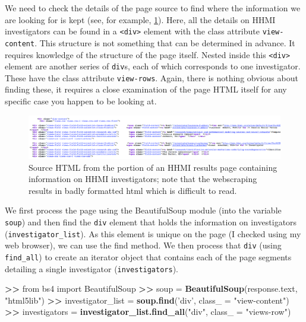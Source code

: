 \documentclass[]{krantz}
\newenvironment{Shaded}{\begin{snugshade}}{\end{snugshade}}
\newcommand{\KeywordTok}[1]{\textcolor[rgb]{0.13,0.29,0.53}{\textbf{#1}}}
\newcommand{\DataTypeTok}[1]{\textcolor[rgb]{0.13,0.29,0.53}{#1}}
\newcommand{\StringTok}[1]{\textcolor[rgb]{0.31,0.60,0.02}{#1}}
\newcommand{\OperatorTok}[1]{\textcolor[rgb]{0.81,0.36,0.00}{\textbf{#1}}}
\newcommand{\ErrorTok}[1]{\textcolor[rgb]{0.64,0.00,0.00}{\textbf{#1}}}
\newcommand{\NormalTok}[1]{#1}
\begin{document}
We need to check the details of the page source to find where the
information we are looking for is kept (see, for example,
\ref{fig:fig2-1}). Here, all the details on HHMI investigators can be
found in a \texttt{\textless{}div\textgreater{}} element with the class
attribute \texttt{view-content}. This structure is not something that
can be determined in advance. It requires knowledge of the structure of
the page itself. Nested inside this
\texttt{\textless{}div\textgreater{}} element are another series of
\texttt{div}s, each of which corresponds to one investigator. These have
the class attribute \texttt{view-rows}. Again, there is nothing obvious
about finding these, it requires a close examination of the page HTML
itself for any specific case you happen to be looking at.

\begin{figure}

{\centering \includegraphics[width=0.7\linewidth]{ChapterWeb/figures/fig2-1} 

}

\caption{Source HTML from the portion of an HHMI results page containing information on HHMI investigators; note that the webscraping results in badly formatted html which is difficult to read.}\label{fig:fig2-1}
\end{figure}

We first process the page using the BeautifulSoup module (into the
variable \texttt{soup}) and then find the \texttt{div} element that
holds the information on investigators (\texttt{investigator\_list}). As
this element is unique on the page (I checked using my web browser), we
can use the find method. We then process that \texttt{div} (using
\texttt{find\_all}) to create an iterator object that contains each of
the page segments detailing a single investigator
(\texttt{investigators}).

\begin{Shaded}
\begin{Highlighting}[]
\OperatorTok{>}\ErrorTok{>}\StringTok{ }\NormalTok{from bs4 import BeautifulSoup}
\OperatorTok{>}\ErrorTok{>}\StringTok{ }\NormalTok{soup =}\StringTok{ }\KeywordTok{BeautifulSoup}\NormalTok{(response.text, }\StringTok{"html5lib"}\NormalTok{)}
\OperatorTok{>}\ErrorTok{>}\StringTok{ }\NormalTok{investigator_list =}\StringTok{ }\KeywordTok{soup.find}\NormalTok{(}\StringTok{'div'}\NormalTok{, }\DataTypeTok{class_ =} \StringTok{"view-content"}\NormalTok{)}
\OperatorTok{>}\ErrorTok{>}\StringTok{ }\NormalTok{investigators =}\StringTok{ }\KeywordTok{investigator_list.find_all}\NormalTok{(}\StringTok{"div"}\NormalTok{, }\DataTypeTok{class_ =} \StringTok{"views-row"}\NormalTok{)}
\end{Highlighting}
\end{Shaded}
\end{document}
